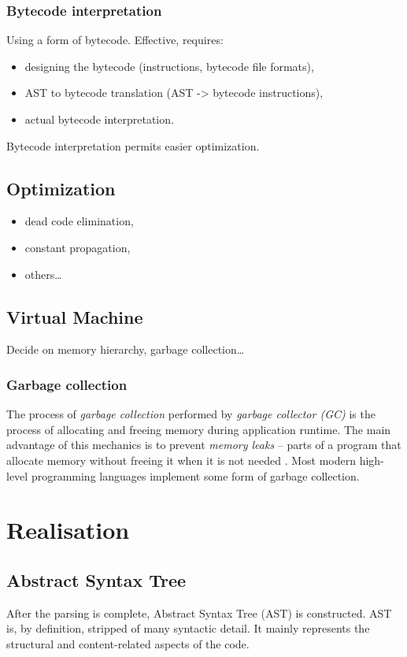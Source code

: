 \documentclass[thesis=M,english]{FITthesis}[2019/12/23]
\begin{document}
\subsection{Bytecode interpretation}
Using a form of bytecode. Effective, requires:
\begin{itemize}
	\item designing the bytecode (instructions, bytecode file formats),
	\item AST to bytecode translation (AST -> bytecode instructions),
	\item actual bytecode interpretation.
\end{itemize}
Bytecode interpretation permits easier optimization.

\section{Optimization}
\begin{itemize}
	\item dead code elimination,
	\item constant propagation,
	\item others\ldots
\end{itemize}

\section{Virtual Machine}
Decide on memory hierarchy, garbage collection\ldots

\subsection{Garbage collection}
The process of \textit{garbage collection} performed by \textit{garbage collector (GC)} is the process of allocating and freeing
memory during application runtime. The main advantage of this mechanics is to prevent \textit{memory leaks} -- parts of a program
that allocate memory without freeing it when it is not needed \cite{memleaks-raygun}. Most modern high-level programming languages
implement some form of garbage collection.



\chapter{Realisation}

\section{Abstract Syntax Tree}
After the parsing is complete, Abstract Syntax Tree (AST) is constructed. AST is, by definition, stripped of many syntactic detail.
It mainly represents the structural and content-related aspects of the code.
\end{document}
